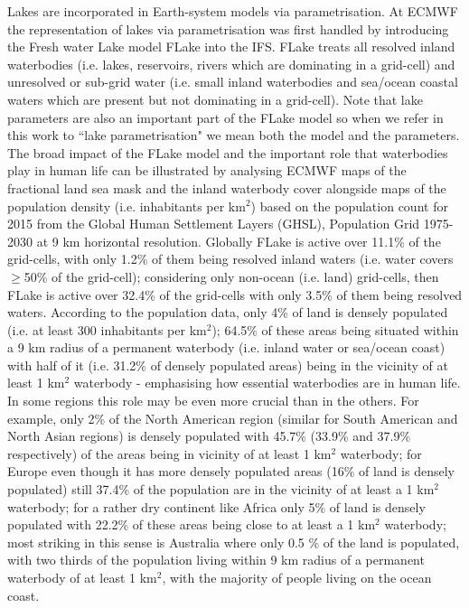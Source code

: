\documentclass[hess, twostagejnl]{copernicus}
\begin{document}
\noindent Lakes are incorporated in Earth-system models via parametrisation. At ECMWF the  representation of lakes via parametrisation was first handled by introducing the Fresh water Lake model FLake \citep{Mironov2008} into the IFS. FLake treats all resolved inland waterbodies (i.e. lakes, reservoirs, rivers which are dominating in a grid-cell) and unresolved or sub-grid water (i.e. small inland waterbodies and sea/ocean coastal waters which are present but not dominating in a grid-cell). Note that lake parameters are also an important part of the FLake model so when we refer in this work to ``lake parametrisation" we mean both the model and the parameters. The broad impact of the FLake model and the important role that waterbodies play in human life can be illustrated by analysing ECMWF maps of the fractional land sea mask and the inland waterbody cover alongside maps of the population density (i.e. inhabitants per km$^2$) based on the population count for 2015 from the Global Human Settlement Layers (GHSL), Population Grid 1975-2030 \citep{GHS,JRC100523} at 9 km horizontal resolution. Globally FLake is active over 11.1\% of the grid-cells, with only 1.2\% of them being resolved inland waters (i.e. water covers $\geq$50\% of the grid-cell); considering only non-ocean (i.e. land) grid-cells, then FLake is active over 32.4\% of the grid-cells with only 3.5\% of them being resolved waters. According to the population data, only 4\% of land is densely populated (i.e. at least 300 inhabitants per km$^2$); 64.5\% of these areas being situated within a 9 km radius of a permanent waterbody (i.e. inland water or sea/ocean coast) with half of it (i.e. 31.2\% of densely populated areas) being in the vicinity of at least 1 km$^2$ waterbody - emphasising how essential waterbodies are in human life. In some regions this role may be even more crucial than in the others. For example, only 2\% of the North American region (similar for South American and North Asian regions) is densely populated with 45.7\% (33.9\% and 37.9\% respectively) of the areas being in vicinity of at least 1 km$^2$ waterbody; for Europe even though it has more densely populated areas (16\% of land is densely populated) still 37.4\% of the population are in the vicinity of at least a 1 km$^2$ waterbody; for a rather dry continent like Africa only 5\% of land is densely populated with 22.2\% of these areas being close to at least a 1 km$^2$ waterbody; most striking in this sense is Australia where only 0.5 \% of the land is populated, with two thirds of the population living within 9 km radius of a permanent waterbody of at least 1 km$^2$, with the majority of people living on the ocean coast. \newline 
\end{document}
